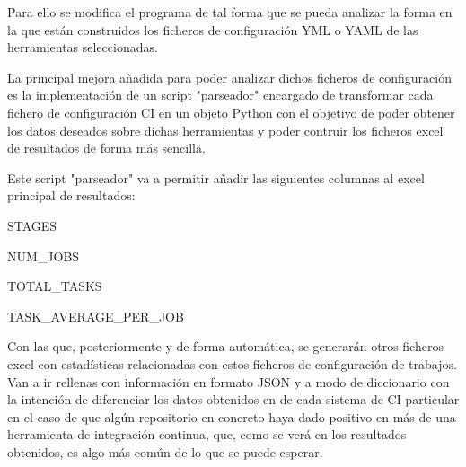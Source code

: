 Para ello se modifica el programa de tal forma que se pueda analizar la forma en la que están construidos los ficheros de configuración YML o YAML de las herramientas seleccionadas.

La principal mejora añadida para poder analizar dichos ficheros de configuración es la implementación de un script "parseador" encargado de transformar cada fichero de configuración CI en un objeto Python con el objetivo de poder obtener los datos deseados sobre dichas herramientas y poder contruir los ficheros excel de resultados de forma más sencilla.

Este script "parseador" va a permitir añadir las siguientes columnas al excel principal de resultados:
\begin{compactitem}
    \item STAGES
    \item NUM\_JOBS
    \item TOTAL\_TASKS
    \item TASK\_AVERAGE\_PER\_JOB
\end{compactitem}

Con las que, posteriormente y de forma automática, se generarán otros ficheros excel con estadísticas relacionadas con estos ficheros de configuración de trabajos. Van a ir rellenas con información en formato JSON y a modo de diccionario con la intención de diferenciar los datos obtenidos en de cada sistema de CI particular en el caso de que algún repositorio en concreto haya dado positivo en más de una herramienta de integración continua, que, como se verá en los resultados obtenidos, es algo más común de lo que se puede esperar.

